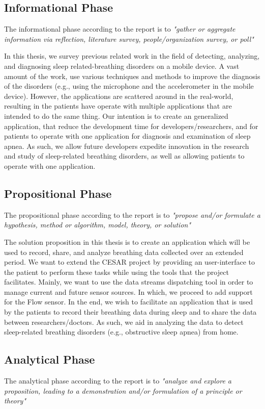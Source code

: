 \subsection{Informational Phase}
The informational phase according to the report is to \textit{"gather or aggregate information via reflection, literature survey, people/organization survey, or poll"}

In this thesis, we survey previous related work in the field of detecting, analyzing, and diagnosing sleep related-breathing disorders on a mobile device. A vast amount of the work, use various techniques and methods to improve the diagnosis of the disorders (e.g., using the microphone and the accelerometer in the mobile device). However, the applications are scattered around in the real-world, resulting in the patients have operate with multiple applications that are intended to do the same thing. Our intention is to create an generalized application, that reduce the development time for developers/researchers, and for patients to operate with one application for diagnosis and examination of sleep apnea. As such, we allow future developers expedite innovation in the research and study of sleep-related breathing disorders, as well as allowing patients to operate with one application. 

\subsection{Propositional Phase}
The propositional phase according to the report is to \textit{"propose and/or formulate a hypothesis, method or algorithm, model, theory, or solution"}

The solution proposition in this thesis is to create an application which will be used to record, share, and analyze breathing data collected over an extended period. We want to extend the CESAR project by providing an user-interface to the patient to perform these tasks while using the tools that the project facilitates. Mainly, we want to use the data streams dispatching tool in order to manage current and future sensor sources. In which, we proceed to add support for the Flow sensor. In the end, we wish to facilitate an application that is used by the patients to record their breathing data during sleep and to share the data between researchers/doctors. As such, we aid in analyzing the data to detect sleep-related breathing disorders (e.g., obstructive sleep apnea) from home. 

\subsection{Analytical Phase}
The analytical phase according to the report is to \textit{"analyze and explore a proposition, leading to a demonstration and/or formulation of a principle or theory"}

